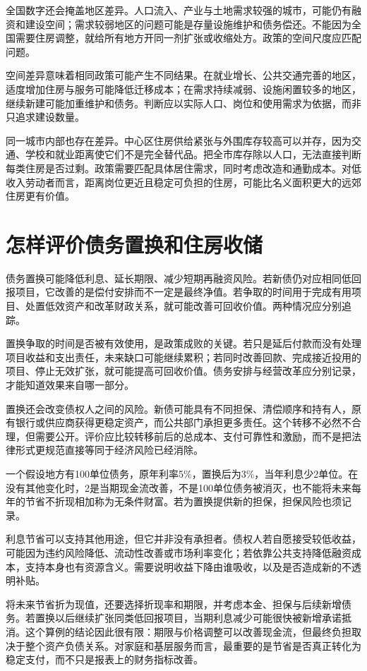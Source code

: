 \documentclass[UTF8,fontset=fandol,zihao=-4,oneside,openany]{ctexbook}
\begin{document}
全国数字还会掩盖地区差异。人口流入、产业与土地需求较强的城市，可能仍有融资和建设空间；需求较弱地区的问题可能是存量设施维护和债务偿还。不能因为全国需要住房调整，就给所有地方开同一剂扩张或收缩处方。政策的空间尺度应匹配问题。

\label{arg:P128}
空间差异意味着相同政策可能产生不同结果。在就业增长、公共交通完善的地区，适度增加住房与服务可能降低迁移成本；在需求持续减弱、设施闲置较多的地区，继续新建可能加重维护和债务。判断应以实际人口、岗位和使用需求为依据，而非只追求建设数量。

同一城市内部也存在差异。中心区住房供给紧张与外围库存较高可以并存，因为交通、学校和就业距离使它们不是完全替代品。把全市库存除以人口，无法直接判断每类住房是否过剩。政策需要匹配具体居住需求，同时考虑改造和通勤成本。对低收入劳动者而言，距离岗位更近且稳定可负担的住房，可能比名义面积更大的远郊住房更有价值。

\section{怎样评价债务置换和住房收储}
债务置换可能降低利息、延长期限、减少短期再融资风险。若新债仍对应相同低回报项目，它改善的是偿付安排而不一定是最终净值。若争取的时间用于完成有用项目、处置低效资产和改革财政关系，就可能改善可回收价值。两种情况应分别追踪。

\label{arg:P129}
置换争取的时间是否被有效使用，是政策成败的关键。若只是延后付款而没有处理项目收益和支出责任，未来缺口可能继续累积；若同时改善回款、完成接近投用的项目、停止无效扩张，就可能提高可回收价值。债务安排与经营改革应分别记录，才能知道效果来自哪一部分。

置换还会改变债权人之间的风险。新债可能具有不同担保、清偿顺序和持有人，原有银行或供应商获得更稳定资产，而公共部门承担更多责任。这个转移不必然不合理，但需要公开。评价应比较转移前后的总成本、支付可靠性和激励，而不是把法律形式更规范直接等同于经济风险已经消除。

一个假设地方有100单位债务，原年利率5\%，置换后为3\%，当年利息少2单位。在没有其他变化时，2是当期现金流改善，不是100单位债务被消灭，也不能将未来每年的节省不折现相加称为无条件财富。若为置换提供新的担保，担保风险也须记录。

\label{arg:P130}
利息节省可以支持其他用途，但它并非没有承担者。债权人若自愿接受较低收益，可能因为违约风险降低、流动性改善或市场利率变化；若依靠公共支持降低融资成本，支持本身也有资源含义。需要说明收益下降由谁吸收，以及是否造成新的不透明补贴。

将未来节省折为现值，还要选择折现率和期限，并考虑本金、担保与后续新增债务。若置换以后继续扩张同类低回报项目，当期利息减少可能很快被新增承诺抵消。这个算例的结论因此很有限：期限与价格调整可以改善现金流，但最终负担取决于整个资产负债关系。对家庭和基层服务而言，最重要的是节省是否真正转化为稳定支付，而不只是报表上的财务指标改善。
\end{document}
